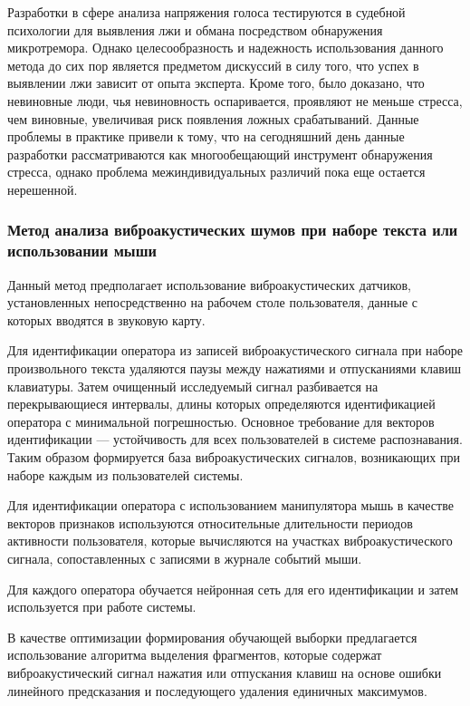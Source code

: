 Разработки в сфере анализа напряжения голоса тестируются в судебной психологии для выявления лжи и обмана посредством обнаружения микротремора. Однако целесообразность и надежность использования данного метода до сих пор является предметом дискуссий в силу того, что успех в выявлении лжи зависит от опыта эксперта. Кроме того, было доказано, что невиновные люди, чья невиновность оспаривается, проявляют не меньше стресса, чем виновные, увеличивая риск появления ложных срабатываний. Данные проблемы в практике привели к тому, что на сегодняшний день данные разработки рассматриваются как многообещающий инструмент обнаружения стресса, однако проблема межиндивидуальных различий пока еще остается нерешенной. \cite{whyMicrophoneIsShit}

\subsubsection{Метод анализа виброакустических шумов при наборе текста или использовании мыши}
Данный метод предполагает использование виброакустических датчиков, установленных непосредственно на рабочем столе пользователя, данные с которых вводятся в звуковую карту. \cite{acousticFatigue}

Для идентификации оператора из записей виброакустического сигнала при наборе произвольного текста удаляются паузы между нажатиями и отпусканиями клавиш клавиатуры. Затем очищенный исследуемый сигнал разбивается на перекрывающиеся интервалы, длины которых определяются идентификацией оператора с минимальной погрешностью. Основное требование для векторов идентификации --- устойчивость для всех пользователей в системе распознавания. Таким образом формируется база виброакустических сигналов, возникающих при наборе каждым из пользователей системы. \cite{acousticFatigue}

Для идентификации оператора с использованием манипулятора мышь в качестве векторов признаков используются относительные длительности периодов активности пользователя, которые вычисляются на участках виброакустического сигнала, сопоставленных с записями в журнале событий мыши. \cite{mouseFatigue}

Для каждого оператора обучается нейронная сеть для его идентификации и затем используется при работе системы. \cite{acousticFatigue}

В качестве оптимизации формирования обучающей выборки предлагается использование алгоритма выделения фрагментов, которые содержат виброакустический сигнал нажатия или отпускания клавиш на основе ошибки линейного предсказания и последующего удаления единичных максимумов. \cite{acousticFatigue}

